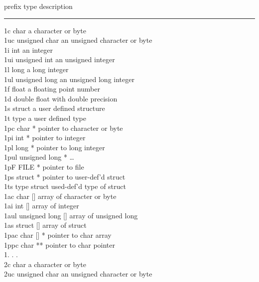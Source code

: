 \begin{mylist}
prefix  type  description \\     \hrule
1c        char                    a character or byte\\
1uc       unsigned char           an unsigned character or byte\\
1i        int                     an integer\\
1ui       unsigned int            an unsigned integer\\
1l        long                    a long integer\\
1ul       unsigned long           an unsigned long integer\\
1f        float                   a floating point number\\
1d        double          float with double precision\\
1s        struct          a user defined structure\\
1t        type                    a user defined type\\
1pc       char *          pointer to character or byte\\
1pi       int *                   pointer to integer\\
1pl       long *          pointer to long integer\\
1pul      unsigned long *         \dots\\
1pF       FILE *          pointer to file\\
1ps       struct *                pointer to user-def'd struct\\
1ts       type struct             used-def'd type of struct\\
1ac       char []                 array of character or byte\\
1ai       int []          array of integer\\
1aul      unsigned long []        array of unsigned long\\
1as       struct []               array of struct\\
1pac      char [] *               pointer to char array\\
1ppc      char **                 pointer to char pointer\\
1.          .                     . \\
2c        char                    a character or byte\\
2uc       unsigned char           an unsigned character or byte\\

\end{mylist}
